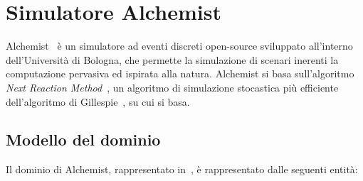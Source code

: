 \documentclass[12pt,a4paper,openright,twoside]{book}
\begin{document}
\section{Simulatore Alchemist}

Alchemist~\cite{DBLP:journals/jos/PianiniMV13} è un simulatore ad eventi discreti open-source sviluppato all'interno dell'Università di Bologna, che permette la simulazione di scenari inerenti la computazione pervasiva ed ispirata alla natura. 
Alchemist si basa sull'algoritmo \textit{Next Reaction Method}~\cite{doi:10.1021/jp993732q}, un algoritmo di simulazione stocastica più efficiente dell'algoritmo di Gillespie~\cite{doi:10.1021/j100540a008}, su cui si basa.

\subsection{Modello del dominio}
Il dominio di Alchemist, rappresentato in~, è rappresentato dalle seguenti entità: 
\end{document}
